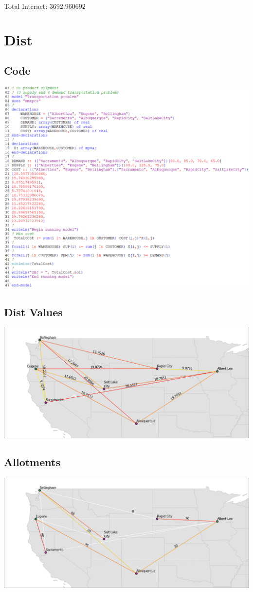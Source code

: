 \documentclass[12pt]{article}
\theoremstyle{definition}
\begin{document}
Total Interact: $3692.960692$

\newpage
\section{Dist}
\subsection{Code}
\includegraphics[width=\textwidth]{codedist.png}
\newpage
\subsection{Dist Values}
\includegraphics[width=\textwidth]{mapdist.png}
\subsection{Allotments}
\includegraphics[width=\textwidth]{solmapdist.png}
\end{document}
